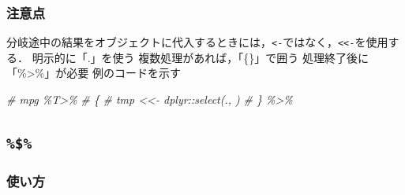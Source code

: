 \documentclass[
]{article}
\newenvironment{Shaded}{\begin{snugshade}}{\end{snugshade}}
\newcommand{\CommentTok}[1]{\textcolor[rgb]{0.56,0.35,0.01}{\textit{#1}}}
\newcommand{\NormalTok}[1]{#1}
\newcommand{\SpecialCharTok}[1]{\textcolor[rgb]{0.00,0.00,0.00}{#1}}
\begin{document}
\hypertarget{ux6ce8ux610fux70b9-1}{%
\subsubsection{注意点}\label{ux6ce8ux610fux70b9-1}}

分岐途中の結果をオブジェクトに代入するときには，\texttt{\textless{}-}ではなく，\texttt{\textless{}\textless{}-}を使用する．
明示的に「.」を使う
複数処理があれば，「\{\}」で囲う
処理終了後に「\%\textgreater\%」が必要
例のコードを示す

\begin{Shaded}
\begin{Highlighting}[]
\CommentTok{\#  mpg \%T\textgreater{}\%}
\CommentTok{\#    \{}
\CommentTok{\#      tmp \textless{}\textless{}{-} dplyr::select(., ) }
\CommentTok{\#    \} \%\textgreater{}\%}
\end{Highlighting}
\end{Shaded}

\hypertarget{section-1}{%
\subsection{\texorpdfstring{\texttt{\%\$\%}}{\%\$\%}}\label{section-1}}

\hypertarget{ux4f7fux3044ux65b9-2}{%
\subsubsection{使い方}\label{ux4f7fux3044ux65b9-2}}

\begin{Shaded}
\end{Shaded}
\end{document}
